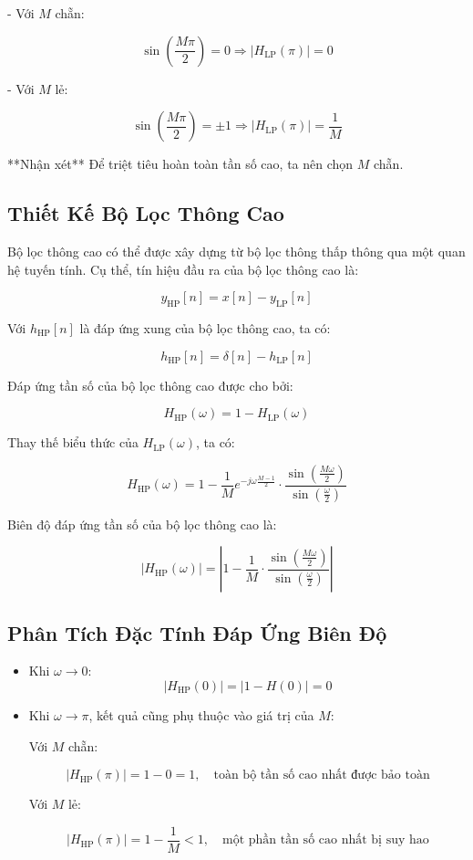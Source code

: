 - Với \( M \) chẵn:

\[
\sin\left(\frac{M\pi}{2}\right) = 0 \Rightarrow |H_{\mathrm{LP}}(\pi)| = 0
\]

- Với \( M \) lẻ:

\[
\sin\left(\frac{M\pi}{2}\right) = \pm 1 \Rightarrow |H_{\mathrm{LP}}(\pi)| = \frac{1}{M}
\]

**Nhận xét** Để triệt tiêu hoàn toàn tần số cao, ta nên chọn \( M \) chẵn.

\subsection*{Thiết Kế Bộ Lọc Thông Cao}

Bộ lọc thông cao có thể được xây dựng từ bộ lọc thông thấp thông qua một quan hệ tuyến tính. Cụ thể, tín hiệu đầu ra của bộ lọc thông cao là:

\[
y_{\mathrm{HP}}[n] = x[n] - y_{\mathrm{LP}}[n]
\]

Với \( h_{\mathrm{HP}}[n] \) là đáp ứng xung của bộ lọc thông cao, ta có:

\[
h_{\mathrm{HP}}[n] = \delta[n] - h_{\mathrm{LP}}[n]
\]

Đáp ứng tần số của bộ lọc thông cao được cho bởi:

\[
H_{\mathrm{HP}}(\omega) = 1 - H_{\mathrm{LP}}(\omega)
\]

Thay thế biểu thức của \( H_{\mathrm{LP}}(\omega) \), ta có:

\[
H_{\mathrm{HP}}(\omega) = 1 - \frac{1}{M} e^{-j \omega \frac{M-1}{2}} \cdot \frac{\sin\left(\frac{M \omega}{2}\right)}{\sin\left(\frac{\omega}{2}\right)}
\]

Biên độ đáp ứng tần số của bộ lọc thông cao là:

\[
|H_{\mathrm{HP}}(\omega)| = \left| 1 - \frac{1}{M} \cdot \frac{\sin\left( \frac{M \omega}{2} \right)}{\sin\left( \frac{\omega}{2} \right)} \right|
\]

\subsection*{Phân Tích Đặc Tính Đáp Ứng Biên Độ}

\begin{itemize}
	\item Khi \( \omega \to 0 \):
	\[
	|H_{\mathrm{HP}}(0)| = |1 - H(0)| = 0
	\]
	
	\item Khi \( \omega \to \pi \), kết quả cũng phụ thuộc vào giá trị của \( M \):
	
	Với \( M \) chẵn:
	
	\[
	|H_{\mathrm{HP}}(\pi)| = 1 - 0 = 1, \quad \text{toàn bộ tần số cao nhất được bảo toàn}
	\]
	
	Với \( M \) lẻ:
	
	\[
	|H_{\mathrm{HP}}(\pi)| = 1 - \frac{1}{M} < 1, \quad \text{một phần tần số cao nhất bị suy hao}
	\]
\end{itemize}



